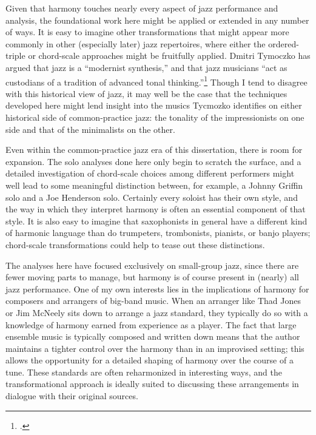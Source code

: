 Given that harmony touches nearly every aspect of jazz performance and
analysis, the foundational work here might be applied or extended in any
number of ways. It is easy to imagine other transformations that might appear
more commonly in other (especially later) jazz repertoires, where either the
ordered-triple or chord-scale approaches might be fruitfully applied. Dmitri
Tymoczko has argued that jazz is a ``modernist synthesis,'' and that jazz
musicians ``act as custodians of a tradition of advanced tonal
thinking.''\footcite[389]{tymoczko:2011} Though I tend to disagree with this
historical view of jazz, it may well be the case that the techniques developed
here might lend insight into the musics Tycmozko identifies on either
historical side of common-practice jazz: the tonality of the impressionists on
one side and that of the minimalists on the other.

Even within the common-practice jazz era of this dissertation, there is room
for expansion. The solo analyses done here only begin to scratch the surface,
and a detailed investigation of chord-scale choices among different performers
might well lead to some meaningful distinction between, for example, a Johnny
Griffin solo and a Joe Henderson solo. Certainly every soloist has their own
style, and the way in which they interpret harmony is often an essential
component of that style. It is also easy to imagine that saxophonists in
general have a different kind of harmonic language than do trumpeters,
trombonists, pianists, or banjo players; chord-scale transformations could
help to tease out these distinctions.

The analyses here have focused exclusively on small-group jazz, since there
are fewer moving parts to manage, but harmony is of course present in (nearly)
all jazz performance. One of my own interests lies in the implications of
harmony for composers and arrangers of big-band music. When an arranger like
Thad Jones or Jim McNeely sits down to arrange a jazz standard, they typically
do so with a knowledge of harmony earned from experience as a player. The fact
that large ensemble music is typically composed and written down means that
the author maintains a tighter control over the harmony than in an improvised
setting; this allows the opportunity for a detailed shaping of harmony over
the course of a tune. These standards are often reharmonized in interesting
ways, and the transformational approach is ideally suited to discussing these
arrangements in dialogue with their original sources.

